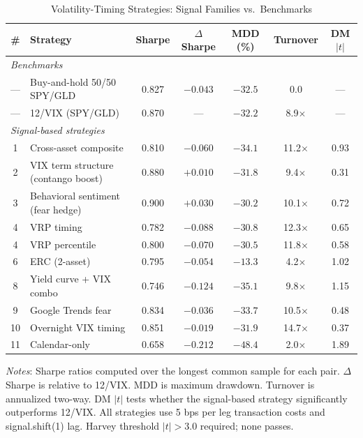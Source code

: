 \documentclass[12pt,a4paper]{article}
\begin{document}
\begin{table}[H]
\centering
\small
\begin{threeparttable}
\caption{Volatility-Timing Strategies: Signal Families vs.\ Benchmarks}
\label{tab:strategy_results}
\begin{tabular}{@{}clccccc@{}}
\toprule
\# & Strategy & Sharpe & $\Delta$Sharpe & MDD (\%) & Turnover & DM $|t|$ \\
\midrule
\multicolumn{7}{l}{\textit{Benchmarks}} \\
--- & Buy-and-hold 50/50 SPY/GLD & 0.827 & $-0.043$ & $-32.5$ & 0.0 & --- \\
--- & 12/VIX (SPY/GLD) & 0.870 & --- & $-32.2$ & 8.9$\times$ & --- \\
\midrule
\multicolumn{7}{l}{\textit{Signal-based strategies}} \\
1 & Cross-asset composite & 0.810 & $-0.060$ & $-34.1$ & 11.2$\times$ & 0.93 \\
2 & VIX term structure (contango boost) & 0.880 & $+0.010$ & $-31.8$ & 9.4$\times$ & 0.31 \\
3 & Behavioral sentiment (fear hedge) & 0.900 & $+0.030$ & $-30.2$ & 10.1$\times$ & 0.72 \\
4 & VRP timing & 0.782 & $-0.088$ & $-30.8$ & 12.3$\times$ & 0.65 \\
4 & VRP percentile & 0.800 & $-0.070$ & $-30.5$ & 11.8$\times$ & 0.58 \\
6 & ERC (2-asset) & 0.795 & $-0.054$ & $-13.3$ & 4.2$\times$ & 1.02 \\
8 & Yield curve + VIX combo & 0.746 & $-0.124$ & $-35.1$ & 9.8$\times$ & 1.15 \\
9 & Google Trends fear & 0.834 & $-0.036$ & $-33.7$ & 10.5$\times$ & 0.48 \\
10 & Overnight VIX timing & 0.851 & $-0.019$ & $-31.9$ & 14.7$\times$ & 0.37 \\
11 & Calendar-only & 0.658 & $-0.212$ & $-48.4$ & 2.0$\times$ & 1.89 \\
\bottomrule
\end{tabular}
\begin{tablenotes}
\small
\item \textit{Notes}: Sharpe ratios computed over the longest common sample for each pair. $\Delta$Sharpe is relative to 12/VIX. MDD is maximum drawdown. Turnover is annualized two-way. DM $|t|$ tests whether the signal-based strategy significantly outperforms 12/VIX. All strategies use 5 bps per leg transaction costs and signal.shift(1) lag. Harvey threshold $|t|>3.0$ required; none passes.
\end{tablenotes}
\end{threeparttable}
\end{table}
\end{document}
